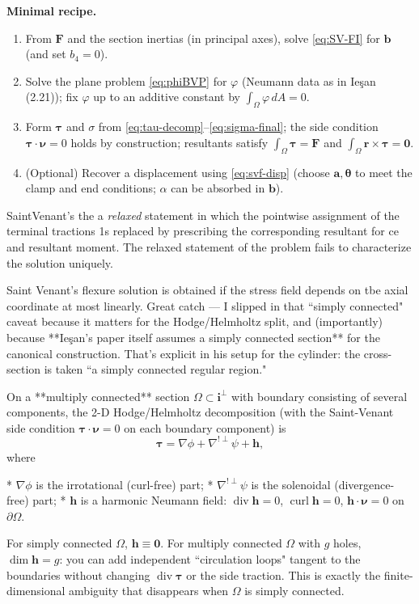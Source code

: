 \bigskip
\noindent\textbf{Minimal recipe.}
\begin{enumerate}
\item From $\bm{F}$ and the section inertias (in principal axes), solve \eqref{eq:SV-FI} for $\bm{b}$ (and set $b_4=0$).
\item Solve the plane problem \eqref{eq:phiBVP} for $\varphi$ (Neumann data as in Ieşan (2.21)); fix $\varphi$ up to an additive constant by $\int_\Omega\varphi\,dA=0$.
\item Form $\bm{\tau}$ and $\sigma$ from \eqref{eq:tau-decomp}–\eqref{eq:sigma-final}; the side condition $\bm{\tau}\cdot\bm{\nu}=0$ holds by construction; resultants satisfy $\int_\Omega\bm{\tau}=\bm{F}$ and $\int_\Omega \bm{r}\times\bm{\tau}=\mathbf{0}$.
\item (Optional) Recover a displacement using \eqref{eq:svf-disp} (choose $\bm{a},\bm{\theta}$ to meet the clamp and end conditions; $\alpha$ can be absorbed in $\bm{b}$).
\end{enumerate}

SaintVenant's the a \emph{relaxed} statement in which the pointwise assignment of the terminal tractions 1s replaced by prescribing the corresponding resultant for ce and resultant moment.
The relaxed statement of the problem fails to characterize the solution uniquely.

Saint Venant's flexure solution is obtained if the stress field depends on tbe axial coordinate at most linearly.
Great catch — I slipped in that ``simply connected" caveat because it matters for the Hodge/Helmholtz split, and (importantly) because **Ieşan’s paper itself assumes a simply connected section** for the canonical construction. That’s explicit in his setup for the cylinder: the cross-section is taken ``a simply connected regular region." 


On a **multiply connected** section $\Omega\subset\mathbf{i}^\perp$ with boundary consisting of several components, the 2-D Hodge/Helmholtz decomposition (with the Saint-Venant side condition $\bm\tau\cdot\bm\nu=0$ on each boundary component) is
\[
\bm\tau = \nabla\phi+\nabla^{!\perp}\psi+\bm h,
\]
where

* $\nabla\phi$ is the irrotational (curl-free) part;
* $\nabla^{!\perp}\psi$ is the solenoidal (divergence-free) part;
* $\bm{h}$ is a harmonic Neumann field: $\operatorname{div}\bm h=0$, $\operatorname{curl}\bm h=0$, $\bm h\cdot\bm\nu=0$ on $\partial\Omega$.

For simply connected $\Omega$, $\bm h\equiv \mathbf{0}$. 
For multiply connected $\Omega$ with $g$ holes, $\dim{\bm h}=g$: you can add independent ``circulation loops" tangent to the boundaries without changing $\operatorname{div}\bm\tau$ or the side traction. 
This is exactly the finite-dimensional ambiguity that disappears when $\Omega$ is simply connected.

